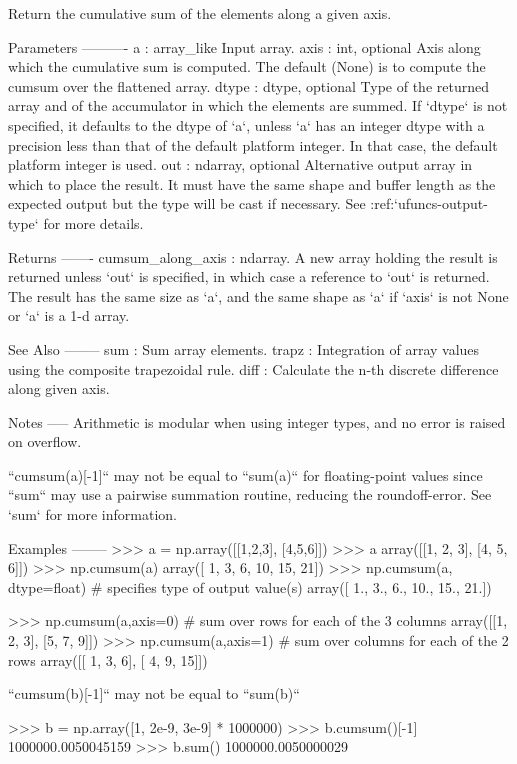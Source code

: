 \begin{DoxyVerb}Return the cumulative sum of the elements along a given axis.

Parameters
----------
a : array_like
    Input array.
axis : int, optional
    Axis along which the cumulative sum is computed. The default
    (None) is to compute the cumsum over the flattened array.
dtype : dtype, optional
    Type of the returned array and of the accumulator in which the
    elements are summed.  If `dtype` is not specified, it defaults
    to the dtype of `a`, unless `a` has an integer dtype with a
    precision less than that of the default platform integer.  In
    that case, the default platform integer is used.
out : ndarray, optional
    Alternative output array in which to place the result. It must
    have the same shape and buffer length as the expected output
    but the type will be cast if necessary. See :ref:`ufuncs-output-type` for
    more details.

Returns
-------
cumsum_along_axis : ndarray.
    A new array holding the result is returned unless `out` is
    specified, in which case a reference to `out` is returned. The
    result has the same size as `a`, and the same shape as `a` if
    `axis` is not None or `a` is a 1-d array.

See Also
--------
sum : Sum array elements.
trapz : Integration of array values using the composite trapezoidal rule.
diff : Calculate the n-th discrete difference along given axis.

Notes
-----
Arithmetic is modular when using integer types, and no error is
raised on overflow.

``cumsum(a)[-1]`` may not be equal to ``sum(a)`` for floating-point
values since ``sum`` may use a pairwise summation routine, reducing
the roundoff-error. See `sum` for more information.

Examples
--------
>>> a = np.array([[1,2,3], [4,5,6]])
>>> a
array([[1, 2, 3],
       [4, 5, 6]])
>>> np.cumsum(a)
array([ 1,  3,  6, 10, 15, 21])
>>> np.cumsum(a, dtype=float)     # specifies type of output value(s)
array([  1.,   3.,   6.,  10.,  15.,  21.])

>>> np.cumsum(a,axis=0)      # sum over rows for each of the 3 columns
array([[1, 2, 3],
       [5, 7, 9]])
>>> np.cumsum(a,axis=1)      # sum over columns for each of the 2 rows
array([[ 1,  3,  6],
       [ 4,  9, 15]])

``cumsum(b)[-1]`` may not be equal to ``sum(b)``

>>> b = np.array([1, 2e-9, 3e-9] * 1000000)
>>> b.cumsum()[-1]
1000000.0050045159
>>> b.sum()                    
1000000.0050000029\end{DoxyVerb}
 \mbox{\label{namespacenumpy_1_1core_1_1fromnumeric_a86b5fcd57e33f447e00d210a4939d8d7}} 
